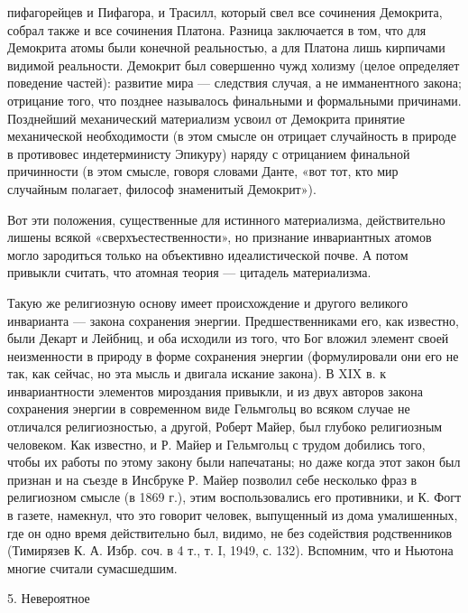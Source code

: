 пифагорейцев  и  Пифагора,  и  Трасилл,  который  свел  все  сочинения
Демокрита, собрал также и все сочинения Платона. Разница заключается в
том,  что  для  Демокрита  атомы  были  конечной  реальностью,  а  для
Платона  лишь кирпичами  видимой реальности.  Демокрит был  совершенно
чужд холизму  (целое определяет  поведение частей): развитие  мира ---
следствия  случая,  а  не  имманентного закона;  отрицание  того,  что
позднее  называлось  финальными  и формальными  причинами.  Позднейший
механический  материализм усвоил  от  Демокрита принятие  механической
необходимости  (в этом  смысле  он отрицает  случайность  в природе  в
противовес  индетерминисту  Эпикуру)  наряду  с  отрицанием  финальной
причинности (в  этом смысле, говоря  словами Данте, «вот тот,  кто мир
случайным полагает, философ знаменитый Демокрит»).

Вот   эти   положения,   существенные  для   истинного   материализма,
действительно  лишены  всякой   «сверхъестественности»,  но  признание
инвариантных   атомов   могло    зародиться   только   на   объективно
идеалистической почве.  А потом  привыкли считать, что  атомная теория
--- цитадель материализма.

Такую  же религиозную  основу имеет  происхождение и  другого великого
инварианта ---  закона сохранения энергии. Предшественниками  его, как
известно,  были Декарт  и Лейбниц,  и оба  исходили из  того, что  Бог
вложил элемент своей неизменности в природу в форме сохранения энергии
(формулировали они  его не  так, как  сейчас, но  эта мысль  и двигала
искание  закона).  В  XIX  в. к  инвариантности  элементов  мироздания
привыкли, и  из двух авторов  закона сохранения энергии  в современном
виде  Гельмгольц  во  всяком  случае не  отличался  религиозностью,  а
другой, Роберт Майер, был глубоко религиозным человеком. Как известно,
и Р.  Майер и Гельмгольц  с трудом добились  того, чтобы их  работы по
этому закону были  напечатаны; но даже когда этот закон  был признан и
на  съезде  в  Инсбруке  Р.  Майер  позволил  себе  несколько  фраз  в
религиозном смысле (в 1869 г.), этим воспользовались его противники, и
К. Фогт  в газете,  намекнул, что это  говорит человек,  выпущенный из
дома умалишенных, где он одно  время действительно был, видимо, не без
содействия родственников  (Тимирязев К. А.  Избр. соч.  в 4 т.,  т. I,
1949, с. 132). Вспомним, что и Ньютона многие считали сумасшедшим.

5. Невероятное

